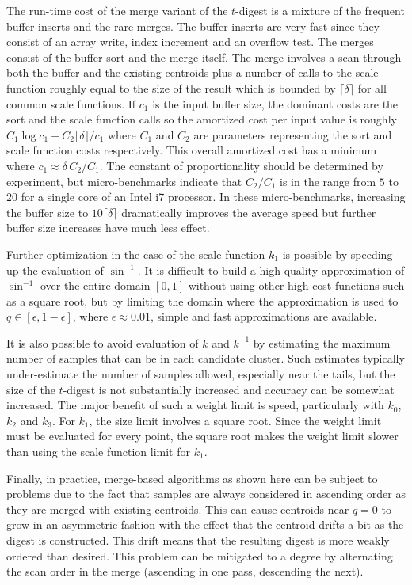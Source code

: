 \documentclass[11pt]{amsart}
\begin{document}
The run-time cost of the merge variant of the $t$-digest is a mixture of the frequent buffer inserts  and the rare  merges. The buffer inserts are very fast since they consist of an array write, index increment and an overflow test. The merges consist of the buffer sort and the merge itself. The merge involves a scan through both the buffer and the existing centroids plus a number of calls to the scale function roughly equal to the size of the result which is bounded by $ \lceil \delta \rceil$ for all common scale functions. If $c_1$ is the input buffer size, the dominant costs are the sort and the scale function calls so the amortized cost per input value is roughly $C_1 \log c_1 + C_2 \lceil \delta \rceil / c_1$ where $C_1$ and $C_2$ are parameters representing the sort and scale function costs respectively. This overall amortized cost has a minimum where $c_1 \approx \delta\, C_2  / C_1$. The constant of proportionality should be determined by experiment, but micro-benchmarks indicate that $C_2 / C_1$ is in the range from $5$ to $20$ for a single core of an Intel i7 processor. In these micro-benchmarks, increasing the buffer size to $10 \lceil \delta \rceil$ dramatically improves the average speed but further buffer size increases have much less effect. 

Further optimization in the case of the scale function $k_1$ is possible by speeding up the evaluation of $\sin^{-1}$. It is difficult to build a high quality approximation of $\sin^{-1}$ over the entire domain $[0,1]$ without using other high cost functions such as a square root, but by limiting the domain where the approximation is used to $q \in [\epsilon, 1-\epsilon]$, where $\epsilon \approx 0.01$, simple and fast approximations are available.

It is also possible to avoid evaluation of $k$ and $k^{-1}$ by estimating the maximum number of samples that can be in each candidate cluster. Such estimates typically under-estimate the number of samples allowed, especially near the tails, but the size of the $t$-digest is not substantially increased and accuracy can be somewhat increased. The major benefit of such a weight limit is speed, particularly with $k_0$, $k_2$ and $k_3$. For $k_1$, the size limit involves a square root. Since the weight limit must be evaluated for every point, the square root makes the weight limit slower than using the scale function limit for $k_1$. 

Finally, in practice, merge-based algorithms as shown here can be subject to problems due to the fact that samples are always considered in ascending order as they are merged with existing centroids. This can cause centroids near $q=0$ to grow in an asymmetric fashion with the effect that the centroid drifts a bit as the digest is constructed. This drift means that the resulting digest is more weakly ordered than desired. This problem can be mitigated to a degree by alternating the scan order in the merge (ascending in one pass, descending the next). 
\end{document}
